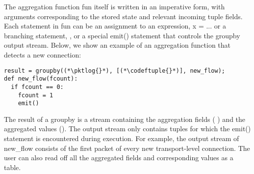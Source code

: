 The aggregation function {\ct fun} itself is written in an imperative form, with
arguments corresponding to the stored state and relevant incoming tuple
fields. Each statement in {\ct fun} can be an assignment to an expression, \ie
{\ct x = ...} or a branching statement, ,
or a special {\ct emit()} statement that controls the {\ct groupby} output
stream. Below, we show an example of an aggregation function that detects a new
connection:
\begin{lstlisting}
result = groupby((*\pktlog{}*), [(*\codeftuple{}*)], new_flow);
def new_flow(fcount):
  if fcount == 0:
    fcount = 1
    emit()
\end{lstlisting}
The result of a {\ct groupby} is a stream containing the aggregation fields (\ie
\txtftuple) and the aggregated values (). The output stream only
contains tuples for which the {\ct emit()} statement is encountered during
execution. For example, the output stream of {\ct new\_flow} consists of the
first packet of every new transport-level connection. The user can also read off
all the aggregated fields and corresponding values as a table.

